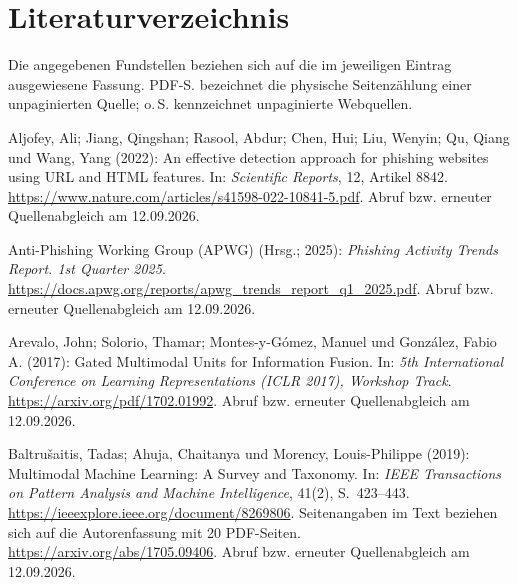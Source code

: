 \chapter*{Literaturverzeichnis}
\noindent Die angegebenen Fundstellen beziehen sich auf die im jeweiligen Eintrag
ausgewiesene Fassung. PDF-S. bezeichnet die physische Seitenzählung einer unpaginierten
Quelle; o.\,S. kennzeichnet unpaginierte Webquellen.

\par\smallskip
\begin{samepage}
\noindent
Aljofey, Ali; Jiang, Qingshan; Rasool, Abdur; Chen, Hui; Liu, Wenyin;
Qu, Qiang und Wang, Yang (2022):
An effective detection approach for phishing websites using URL and HTML features.
In: \textit{Scientific Reports}, 12, Artikel 8842.
\url{https://www.nature.com/articles/s41598-022-10841-5.pdf}.
Abruf bzw. erneuter Quellenabgleich am 12.09.2026.
\par\end{samepage}
\par\smallskip
\begin{samepage}
\noindent
Anti-Phishing Working Group (APWG) (Hrsg.; 2025):
\textit{Phishing Activity Trends Report. 1st Quarter 2025}.
\url{https://docs.apwg.org/reports/apwg_trends_report_q1_2025.pdf}.
Abruf bzw. erneuter Quellenabgleich am 12.09.2026.
\par\end{samepage}
\par\smallskip
\begin{samepage}
\noindent
Arevalo, John; Solorio, Thamar; Montes-y-Gómez, Manuel und González, Fabio A. (2017):
Gated Multimodal Units for Information Fusion.
In: \textit{5th International Conference on Learning Representations (ICLR 2017),
Workshop Track}.
\url{https://arxiv.org/pdf/1702.01992}.
Abruf bzw. erneuter Quellenabgleich am 12.09.2026.
\par\end{samepage}
\par\smallskip
\begin{samepage}
\noindent
Baltrušaitis, Tadas; Ahuja, Chaitanya und Morency, Louis-Philippe (2019):
Multimodal Machine Learning: A Survey and Taxonomy.
In: \textit{IEEE Transactions on Pattern Analysis and Machine Intelligence},
41(2), S.~423--443.
\url{https://ieeexplore.ieee.org/document/8269806}.
Seitenangaben im Text beziehen sich auf die Autorenfassung mit 20 PDF-Seiten. \url{https://arxiv.org/abs/1705.09406}.
Abruf bzw. erneuter Quellenabgleich am 12.09.2026.
\par\end{samepage}

